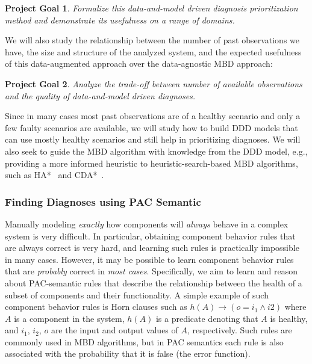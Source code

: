 \documentclass[12pt]{article}
\newtheorem{problem}{Project Goal}
\begin{document}
\begin{problem}
Formalize this data-and-model driven diagnosis prioritization method and demonstrate its usefulness on a range of domains. 
\end{problem}


We will also study the relationship between the number of past observations we have, the size and structure of the analyzed system, and the expected usefulness of this data-augmented approach over the data-agnostic MBD approach: 
\begin{problem}
Analyze the trade-off between number of available observations and the quality of data-and-model driven diagnoses.
\end{problem}
Since in many cases most past observations are of a healthy scenario and only a few faulty scenarios are available, we will study how to build DDD models that can use mostly healthy scenarios and still help in prioritizing diagnoses. We will also seek to guide the MBD algorithm with knowledge from the DDD model, e.g., providing a more informed heuristic to heuristic-search-based MBD algorithms, such as HA*~\cite{feldman2006two} and CDA*~\cite{williams2007conflict}. 



\subsubsection{Finding Diagnoses using PAC Semantic}

Manually modeling {\em exactly} how components will {\em always} behave in a complex system is very difficult. In particular, obtaining component behavior rules that are always correct is very hard, and learning such rules is practically impossible in many cases. However, it may be possible to learn component behavior rules that are {\em probably} correct in {\em most cases}. Specifically, we aim to learn and reason about PAC-semantic rules that describe the relationship between 
the health of a subset of components and their functionality. 
A simple example of such component behavior rules is Horn clauses such as $h(A)\rightarrow (o = i_1 \wedge i2)$
where $A$ is a component in the system, $h(A)$ is a predicate denoting that $A$ is healthy, and $i_1$, $i_2$, $o$ are the input and output values of $A$, respectively. Such rules are commonly used in MBD algorithms,
but in PAC semantics each rule is also associated with the probability that it is false (the error function). 
\end{document}
